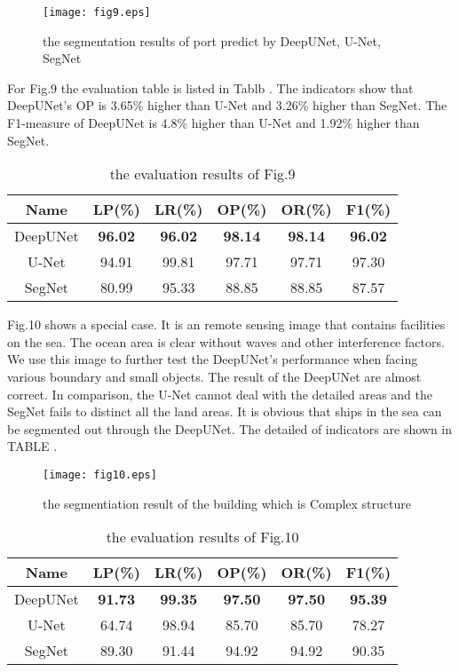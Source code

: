 \documentclass[conference]{IEEEtran}
\begin{document}
\begin{figure}[htbp]
\setlength{\abovecaptionskip}{0pt}
\setlength{\belowcaptionskip}{-10pt}
\centering
\texttt{[image: fig9.eps]}
\caption{the segmentation results of port predict by DeepUNet, U-Net, SegNet}
\label{fig9}
\end{figure}

For Fig.9 the evaluation table is listed in Tablb \uppercase\expandafter{}. The indicators show that DeepUNet's OP is 3.65\% higher than U-Net and 3.26\% higher than SegNet. The F1-measure of DeepUNet is 4.8\% higher than U-Net and 1.92\% higher than SegNet.

\begin{table}[h]
\centering
\caption{the evaluation results of Fig.9}
\begin{tabular}{|c|c|c|c|c|c|}
\hline
Name & LP(\%) & LR(\%) & OP(\%) & OR(\%) & F1(\%) \\
\hline
DeepUNet & \textbf{96.02} & \textbf{96.02} & \textbf{98.14} & \textbf{98.14} & \textbf{96.02} \\
\hline
U-Net & 94.91 & 99.81 & 97.71 & 97.71 & 97.30 \\
\hline
SegNet & 80.99 & 95.33 & 88.85 & 88.85 & 87.57 \\
\hline
\end{tabular}
\label{table4}
\end{table}

Fig.10 shows a special case. It is an remote sensing image that contains facilities  on the sea. The ocean area is clear without waves and other interference factors. We use this image to further test the DeepUNet's performance when facing various boundary and small objects.  The result of the DeepUNet are almost correct. In comparison, the U-Net cannot deal with the detailed areas and the SegNet fails to distinct all the land areas. It is obvious that  ships in the sea can be  segmented out through the DeepUNet. The detailed of indicators are shown in TABLE \uppercase\expandafter{}.

\begin{figure}[h]
\setlength{\abovecaptionskip}{0pt}
\setlength{\belowcaptionskip}{-10pt}
\centering
\texttt{[image: fig10.eps]}
\caption{the segmentiation result of  the building which is Complex structure}
\label{fig10}
\end{figure}

\begin{table}[h]
\centering
\caption{the evaluation results of Fig.10}
\begin{tabular}{|c|c|c|c|c|c|}
\hline
Name & LP(\%) & LR(\%) & OP(\%) & OR(\%) & F1(\%) \\
\hline
DeepUNet & \textbf{91.73} & \textbf{99.35} & \textbf{97.50} & \textbf{97.50} & \textbf{95.39} \\
\hline
U-Net & 64.74 & 98.94 & 85.70 & 85.70 & 78.27 \\
\hline
SegNet & 89.30 & 91.44 & 94.92 & 94.92 & 90.35 \\
\hline
\end{tabular}
\label{table5}
\end{table}
\end{document}
